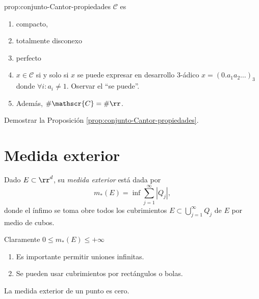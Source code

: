  \begin{proposicion}{prop:conjunto-Cantor-propiedades} $\mathscr{C}$ es 
 
 \begin{enumerate}
  \item  compacto,
  \item totalmente disconexo 
  \item perfecto
  \item $x\in \mathscr{C}$ si y solo si $x$ se puede expresar en desarrollo $3$-ádico $x=(0.a_1a_2\ldots)_3$ donde $\forall i: a_i\neq 1$. Oservar el ``se puede''.
  \item Adem\'as, $\# \mathscr{C}=\# \rr$.
 \end{enumerate}

 

 \end{proposicion}
 
 \begin{ejercicio}{}
 Demostrar la Proposici\'on \ref{prop:conjunto-Cantor-propiedades}.
 \end{ejercicio}
 
 \section{Medida exterior}
 
 \begin{definicion}{}
 Dado $E\subset \rr^d$, su \emph{medida exterior} est\'a dada por 
 \[
 m_*(E)=\inf \sum\limits_{j=1}^{\infty} |Q_j|,
 \]
 donde el \'infimo se toma obre todos los cubrimientos  $E\subset \bigcup\limits_{j=1}^{\infty} Q_j$ de $E$ por medio de cubos.
 \end{definicion}
 
 Claramente $0\leq m_{*}(E)\leq +\infty$
 
 \begin{observacion}{}
 \begin{enumerate}
    \item  Es importante permitir uniones infinitas.
     \item Se pueden usar cubrimientos por rect\'angulos o bolas.
 \end{enumerate}
  \end{observacion}
  
  \begin{ejemplo}{}
  La medida exterior de un punto es cero.
  \end{ejemplo}
  
